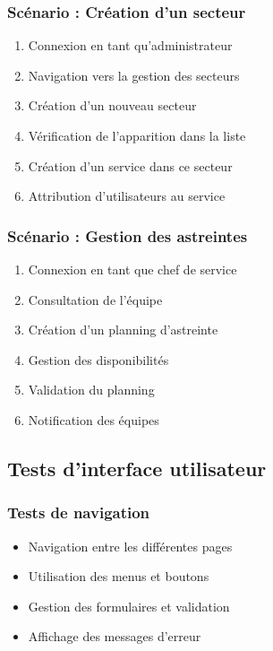 \subsubsection{Scénario : Création d'un secteur}
\begin{enumerate}
    \item Connexion en tant qu'administrateur
    \item Navigation vers la gestion des secteurs
    \item Création d'un nouveau secteur
    \item Vérification de l'apparition dans la liste
    \item Création d'un service dans ce secteur
    \item Attribution d'utilisateurs au service
\end{enumerate}

\subsubsection{Scénario : Gestion des astreintes}
\begin{enumerate}
    \item Connexion en tant que chef de service
    \item Consultation de l'équipe
    \item Création d'un planning d'astreinte
    \item Gestion des disponibilités
    \item Validation du planning
    \item Notification des équipes
\end{enumerate}

\subsection{Tests d'interface utilisateur}
\subsubsection{Tests de navigation}
\begin{itemize}
    \item Navigation entre les différentes pages
    \item Utilisation des menus et boutons
    \item Gestion des formulaires et validation
    \item Affichage des messages d'erreur
\end{itemize}

